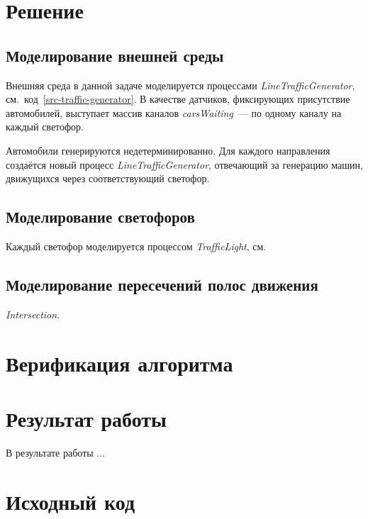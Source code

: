 \documentclass[a4paper,10pt]{article}
\begin{document}
\section{Решение}

\subsection{Моделирование внешней среды}
Внешняя среда в данной задаче моделируется процессами \textit{LineTrafficGenerator}, 
см.~код~\ref{src-traffic-generator}.
В качестве датчиков, фиксирующих присутствие автомобилей, 
выступает массив каналов \textit{carsWaiting}~--- по одному каналу на каждый светофор.

Автомобили генерируются недетерминированно. 
Для каждого направления создаётся новый процесс \textit{LineTrafficGenerator},
отвечающий за генерацию машин, движущихся через соответствующий светофор.



\subsection{Моделирование светофоров}
Каждый светофор моделируется процессом \textit{TrafficLight}, см. 



\subsection{Моделирование пересечений полос движения}

\textit{Intersection}.




\section{Верификация алгоритма}




\section{Результат работы}
В результате работы ...

\pagebreak

\appendix
\section{Исходный код}



\pagebreak



\end{document}
